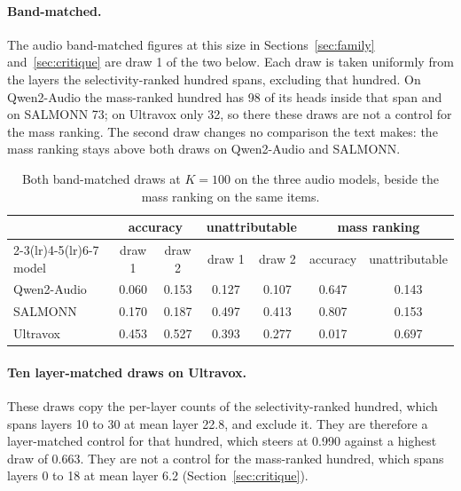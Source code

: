\documentclass[11pt]{article}
\begin{document}
\paragraph{Band-matched.} The audio band-matched figures at this size in
Sections~\ref{sec:family} and~\ref{sec:critique} are draw 1 of the two below.
Each draw is taken uniformly from the layers the selectivity-ranked hundred
spans, excluding that hundred. On Qwen2-Audio the mass-ranked hundred has 98 of
its heads inside that span and on SALMONN 73; on Ultravox only 32, so there these
draws are not a control for the mass ranking. The second draw changes no
comparison the text makes: the mass ranking stays above both draws on Qwen2-Audio
and SALMONN.

\begin{table}[H]\centering\small
\begin{tabular}{lcccccc}
\toprule
 & \multicolumn{2}{c}{accuracy} & \multicolumn{2}{c}{unattributable} & \multicolumn{2}{c}{mass ranking} \\
\cmidrule(lr){2-3}\cmidrule(lr){4-5}\cmidrule(lr){6-7}
model & draw 1 & draw 2 & draw 1 & draw 2 & accuracy & unattributable \\
\midrule
Qwen2-Audio & 0.060 & 0.153 & 0.127 & 0.107 & 0.647 & 0.143 \\
SALMONN     & 0.170 & 0.187 & 0.497 & 0.413 & 0.807 & 0.153 \\
Ultravox    & 0.453 & 0.527 & 0.393 & 0.277 & 0.017 & 0.697 \\
\bottomrule
\end{tabular}
\caption{Both band-matched draws at $K{=}100$ on the three audio models, beside
the mass ranking on the same items.}
\label{tab:app-band}
\end{table}

\paragraph{Ten layer-matched draws on Ultravox.} These draws copy the per-layer
counts of the selectivity-ranked hundred, which spans layers 10 to 30 at mean
layer 22.8, and exclude it. They are therefore a layer-matched control for that
hundred, which steers at 0.990 against a highest draw of 0.663. They are not a
control for the mass-ranked hundred, which spans layers 0 to 18 at mean layer 6.2
(Section~\ref{sec:critique}).
\end{document}
